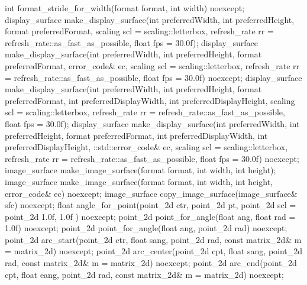 \begin{codeblock}
{{{{  int format_stride_for_width(format format, int width) noexcept;
  display_surface make_display_surface(int preferredWidth,
    int preferredHeight, format preferredFormat,
    scaling scl = scaling::letterbox,
    refresh_rate rr = refresh_rate::as_fast_as_possible, float fps = 30.0f);
  display_surface make_display_surface(int preferredWidth,
    int preferredHeight, format preferredFormat, error_code& ec,
    scaling scl = scaling::letterbox,
    refresh_rate rr = refresh_rate::as_fast_as_possible, float fps = 30.0f) noexcept;
  display_surface make_display_surface(int preferredWidth,
    int preferredHeight, format preferredFormat, int preferredDisplayWidth, 
    int preferredDisplayHeight, scaling scl = scaling::letterbox,
    refresh_rate rr = refresh_rate::as_fast_as_possible, float fps = 30.0f);
  display_surface make_display_surface(int preferredWidth,
    int preferredHeight, format preferredFormat, int preferredDisplayWidth, 
    int preferredDisplayHeight, ::std::error_code& ec,
    scaling scl = scaling::letterbox,
    refresh_rate rr = refresh_rate::as_fast_as_possible, float fps = 30.0f) noexcept;
  image_surface make_image_surface(format format, int width, int height);
  image_surface make_image_surface(format format, int width, int height, 
    error_code& ec) noexcept;
  image_surface copy_image_surface(image_surface& sfc) noexcept;
  float angle_for_point(point_2d ctr, point_2d pt,
    point_2d scl = point_2d{ 1.0f, 1.0f }) noexcept;
  point_2d point_for_angle(float ang, float rad = 1.0f) noexcept;
  point_2d point_for_angle(float ang, point_2d rad) noexcept;
  point_2d arc_start(point_2d ctr, float sang, point_2d rad, 
    const matrix_2d& m = matrix_2d{}) noexcept;
  point_2d arc_center(point_2d cpt, float sang, point_2d rad, 
    const matrix_2d& m = matrix_2d{}) noexcept;
  point_2d arc_end(point_2d cpt, float eang, point_2d rad, 
    const matrix_2d& m = matrix_2d{}) noexcept;
} } } }

\end{codeblock}
%
